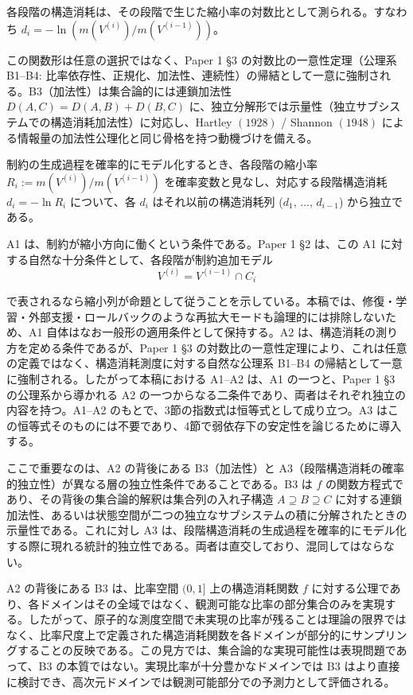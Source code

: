 \documentclass[12pt,a4paper]{article}
\begin{document}
\begin{assumption}[A2]
各段階の構造消耗は、その段階で生じた縮小率の対数比として測られる。すなわち
$d_i = -\ln(m(V^{(i)})/m(V^{(i-1)}))$。

この関数形は任意の選択ではなく、Paper 1 §3 の対数比の一意性定理（公理系 B1–B4: 比率依存性、正規化、加法性、連続性）の帰結として一意に強制される。B3（加法性）は集合論的には連鎖加法性
$D(A,C) = D(A,B) + D(B,C)$
に、独立分解形では示量性（独立サブシステムでの構造消耗加法性）に対応し、Hartley $(1928)$ / Shannon $(1948)$ による情報量の加法性公理化と同じ骨格を持つ動機づけを備える。
\end{assumption}

\begin{assumption}[A3]
制約の生成過程を確率的にモデル化するとき、各段階の縮小率 $R_i := m(V^{(i)})/m(V^{(i-1)})$ を確率変数と見なし、対応する段階構造消耗 $d_i = -\ln R_i$ について、各 $d_i$ はそれ以前の構造消耗列 ($d_1$, ..., $d_{i-1}$) から独立である。
\end{assumption}

A1 は、制約が縮小方向に働くという条件である。Paper 1 §2 は、この A1 に対する自然な十分条件として、各段階が制約追加モデル \[
V^{(i)} = V^{(i-1)} ∩ C_{i}
\]

で表されるなら縮小列が命題として従うことを示している。本稿では、修復・学習・外部支援・ロールバックのような再拡大モードも論理的には排除しないため、A1 自体はなお一般形の適用条件として保持する。A2 は、構造消耗の測り方を定める条件であるが、Paper 1 §3 の対数比の一意性定理により、これは任意の定義ではなく、構造消耗測度に対する自然な公理系 B1--B4 の帰結として一意に強制される。したがって本稿における A1--A2 は、A1 の一つと、Paper 1 §3 の公理系から導かれる A2 の一つからなる二条件であり、両者はそれぞれ独立の内容を持つ。A1--A2 のもとで、3節の指数式は恒等式として成り立つ。A3 はこの恒等式そのものには不要であり、4節で弱依存下の安定性を論じるために導入する。

ここで重要なのは、A2 の背後にある B3（加法性）と A3（段階構造消耗の確率的独立性）が異なる層の独立性条件であることである。B3 は \(f\) の関数方程式であり、その背後の集合論的解釈は集合列の入れ子構造 \(A \supseteq B \supseteq C\) に対する連鎖加法性、あるいは状態空間が二つの独立なサブシステムの積に分解されたときの示量性である。これに対し A3 は、段階構造消耗の生成過程を確率的にモデル化する際に現れる統計的独立性である。両者は直交しており、混同してはならない。

A2 の背後にある B3 は、比率空間 \((0,1]\) 上の構造消耗関数 \(f\) に対する公理であり、各ドメインはその全域ではなく、観測可能な比率の部分集合のみを実現する。したがって、原子的な測度空間で未実現の比率が残ることは理論の限界ではなく、比率尺度上で定義された構造消耗関数を各ドメインが部分的にサンプリングすることの反映である。この見方では、集合論的な実現可能性は表現問題であって、B3 の本質ではない。実現比率が十分豊かなドメインでは B3 はより直接に検討でき、高次元ドメインでは観測可能部分での予測力として評価される。
\end{document}
